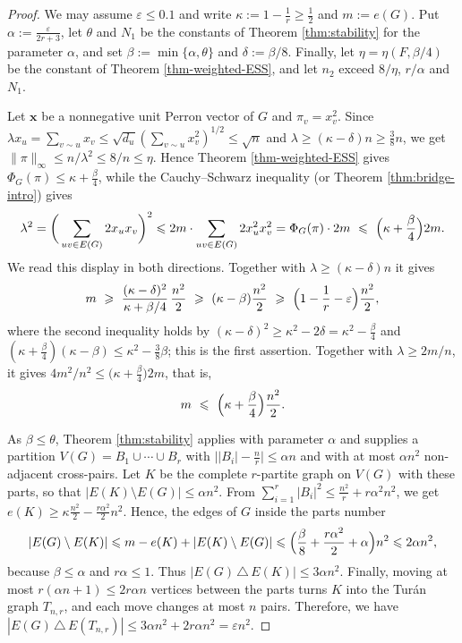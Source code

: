 \documentclass[11pt, a4paper]{article}
\theoremstyle{definition}
\theoremstyle{plain}
\renewcommand{\le}{\leqslant}
\renewcommand{\ge}{\geqslant}
\begin{document}
\begin{proof}
We may assume $\varepsilon \le 0.1$ and write
$\kappa :=1-\frac1r\ge \frac12$ and $m:=e(G)$. Put
$\alpha :=\frac{\varepsilon}{2r+3}$, let $\theta$ and $N_1$
be the constants of Theorem \ref{thm:stability} for the
parameter $\alpha$, and set
$\beta :=\min \{\alpha ,\theta \}$ and $\delta :=\beta /8$.
Finally, let $\eta =\eta (F,\beta /4)$ be the constant of
Theorem \ref{thm-weighted-ESS}, and let $n_2$ exceed
$8/\eta$, $r/\alpha$ and $N_1$.

Let $\bm{x}$ be a nonnegative unit Perron vector of $G$ and
$\pi_v=x_v^{2}$. Since $\lambda x_u=\sum_{v\sim u}x_v\le
\sqrt{d_u}(\sum_{v\sim u}x_v^{2})^{1/2}\le \sqrt n$ and
$\lambda \ge (\kappa -\delta )n\ge \frac38 n$, we get
$\lVert \pi \rVert_\infty \le n/\lambda^{2}\le 8/n\le \eta$.
Hence Theorem \ref{thm-weighted-ESS} gives
$\Phi_G(\pi )\le \kappa +\frac{\beta}{4}$, while the
Cauchy--Schwarz inequality (or Theorem
\ref{thm:bridge-intro}) gives
\[
  \lambda^{2}=\bigg(\sum_{uv\in E(G)}2x_ux_v\bigg)^{2}
  \le 2m \cdot \sum_{uv\in E(G)}2x_u^{2}x_v^{2}
  =\Phi_G(\pi )\cdot 2m
  \ \le\ \Bigl(\kappa +\frac{\beta}{4}\Bigr)2m .
\]
We read this display in both directions. Together with
$\lambda \ge (\kappa -\delta )n$ it gives
\[
  m\ \ge\ \frac{(\kappa -\delta )^{2}}{\kappa +\beta /4}
  \,\frac{n^{2}}{2}\ \ge\ (\kappa -\beta ) \frac{n^{2}}{2}
  \ \ge\ \Bigl(1-\frac1r-\varepsilon \Bigr) \frac{n^{2}}{2},
\]
where the second inequality holds by $(\kappa -\delta )^{2}\ge \kappa^{2}-2\delta
=\kappa^{2}-\frac{\beta}{4}$ and $(\kappa +\frac{\beta}{4}) (\kappa -\beta ) \le \kappa^{2}-\frac38\beta$; this
is the first assertion. Together with $\lambda \ge 2m/n$, it
gives $4m^{2}/n^{2}\le \bigl(\kappa +\frac{\beta}{4}
\bigr)2m$, that is,
\[
  m\ \le\ \Bigl(\kappa +\frac{\beta}{4}\Bigr)
  \frac{n^{2}}{2}.
\]

As $\beta \le \theta$, Theorem \ref{thm:stability} applies
with parameter $\alpha$ and supplies a partition
$V(G)=B_1\cup \cdots \cup B_r$ with
$\bigl\lvert |B_i|-\frac nr\bigr\rvert \le \alpha n$ and
with at most $\alpha n^{2}$ non-adjacent cross-pairs. Let
$K$ be the complete $r$-partite graph on $V(G)$ with these
parts, so that $|E(K)\setminus E(G)|\le \alpha n^{2}$. From
$\sum_{i=1}^r |B_i|^{2}\le \frac{n^{2}}{r}+r\alpha^{2}n^{2}$, 
we get $e(K)\ge \kappa \frac{n^{2}}{2}
-\frac{r\alpha^{2}}{2}n^{2}$. 
Hence, the edges of $G$
inside the parts number
\[
  |E(G)\setminus E(K)|\le m-e(K)+|E(K)\setminus E(G)|
  \le \Bigl(\frac{\beta}{8}+\frac{r\alpha^{2}}{2}
  +\alpha \Bigr)n^{2}\le 2\alpha n^{2},
\]
because $\beta \le \alpha$ and $r\alpha \le 1$. Thus
$|E(G)\, \triangle \, E(K)|\le 3\alpha n^{2}$. Finally, moving at most $r(\alpha n+1)\le 2r\alpha n$ vertices between the parts turns $K$ into the 
Tur\'{a}n graph $T_{n,r}$, 
and each move changes at most $n$ pairs. Therefore, we have 
$|E(G)\, \triangle \, E(T_{n,r})|\le 3\alpha n^{2}+2r\alpha n^{2} =\varepsilon n^{2}$.
\end{proof}
\end{document}
